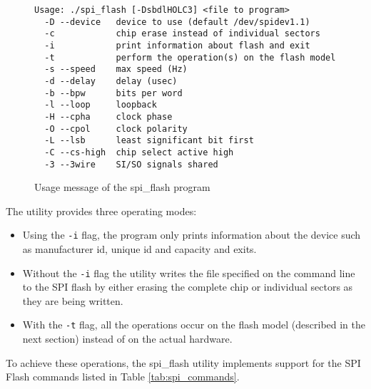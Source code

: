 \begin{figure}[h!]
\lstset{basicstyle=\scriptsize\ttfamily}
\begin{lstlisting}
Usage: ./spi_flash [-DsbdlHOLC3] <file to program>
  -D --device   device to use (default /dev/spidev1.1)
  -c            chip erase instead of individual sectors
  -i            print information about flash and exit
  -t            perform the operation(s) on the flash model
  -s --speed    max speed (Hz)
  -d --delay    delay (usec)
  -b --bpw      bits per word
  -l --loop     loopback
  -H --cpha     clock phase
  -O --cpol     clock polarity
  -L --lsb      least significant bit first
  -C --cs-high  chip select active high
  -3 --3wire    SI/SO signals shared
\end{lstlisting}
\caption{Usage message of the spi\_flash program}
\end{figure}

The utility provides three operating modes:

\begin{itemize}
 \item Using the \texttt{-i} flag, the program only prints information about the device such as manufacturer id, unique id and capacity and exits.
 \item Without the \texttt{-i} flag the utility writes the file specified on the command line to the SPI flash by either erasing the complete chip or individual sectors as they are being written.
 \item With the \texttt{-t} flag, all the operations occur on the flash model (described in the next section) instead of on the actual hardware.
\end{itemize}

To achieve these operations, the spi\_flash utility implements support for the SPI Flash commands listed in Table \ref{tab:spi_commands}.

